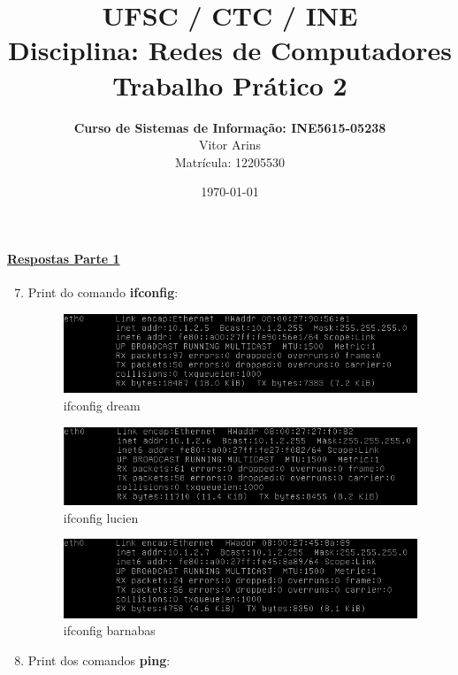 \documentclass[a4paper, 12pt]{article}
\title{UFSC / CTC / INE \\
{\bf Disciplina: Redes de Computadores} \\
{\bf Trabalho Prático 2}}
\author{ {\bf Curso de Sistemas de Informação: INE5615-05238}  \\
  Vitor Arins  \\
  Matrícula: 12205530
}
\date{\today}
\begin{document}
\maketitle

\FloatBarrier
\paragraph{\underline{Respostas Parte 1}}

\begin{enumerate}
  \setcounter{enumi}{6}

\FloatBarrier
\item Print do comando {\bf ifconfig}:

\begin{figure}[h!]
\centering
\includegraphics[width=\textwidth]{1-ifconfig-dream.png}
\caption{ifconfig dream}
\end{figure}

\begin{figure}[h!]
\centering
\includegraphics[width=\textwidth]{1-ifconfig-lucien.png}
\caption{ifconfig lucien}
\end{figure}

\begin{figure}[h!]
\centering
\includegraphics[width=\textwidth]{1-ifconfig-barnabas.png}
\caption{ifconfig barnabas}
\end{figure}

\FloatBarrier
\item Print dos comandos {\bf ping}:


\end{enumerate}
\end{document}

